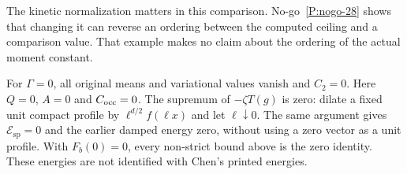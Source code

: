 The kinetic normalization matters in this comparison.
No-go~\ref{P:nogo-28} shows that changing it can reverse an ordering
between the computed ceiling and a comparison value. That example makes
no claim about the ordering of the actual moment constant.


For $\Gamma = 0$, all original means and variational values vanish and $C_2 =
0$. Here $Q = 0$, $A = 0$ and $C_{\rm occ} = 0$. The supremum of $-\zeta T(g)$
is zero: dilate a fixed unit compact profile by $\ell^{d/2}f(\ell x)$ and let
$\ell\downarrow0$. The same argument gives $\mathcal{E}_{\mathrm{sp}} = 0$ and
the earlier damped energy zero, without using a zero vector as a unit profile.
With $F_b(0) = 0$, every non-strict bound above is the zero identity. These
energies are not identified with Chen's printed energies.
